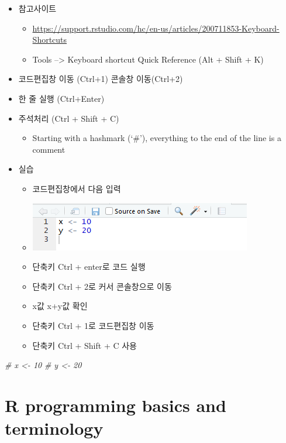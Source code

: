 \documentclass[]{book}
\newenvironment{Shaded}{\begin{snugshade}}{\end{snugshade}}
\newcommand{\CommentTok}[1]{\textcolor[rgb]{0.56,0.35,0.01}{\textit{#1}}}
\providecommand{\tightlist}{%
  \setlength{\itemsep}{0pt}\setlength{\parskip}{0pt}}
\begin{document}
\begin{itemize}
\item
  참고사이트

  \begin{itemize}
  \tightlist
  \item
    \url{https://support.rstudio.com/hc/en-us/articles/200711853-Keyboard-Shortcuts}
  \item
    Tools --\textgreater{} Keyboard shortcut Quick Reference (Alt + Shift + K)
  \end{itemize}
\item
  코드편집창 이동 (Ctrl+1) 콘솔창 이동(Ctrl+2)
\item
  한 줄 실행 (Ctrl+Enter)
\item
  주석처리 (Ctrl + Shift + C)

  \begin{itemize}
  \tightlist
  \item
    Starting with a hashmark (`\#'), everything to the end of the line is a comment
  \end{itemize}
\item
  실습

  \begin{itemize}
  \tightlist
  \item
    코드편집창에서 다음 입력
  \item
    \includegraphics{images/01-14.PNG}\\
  \item
    단축키 Ctrl + enter로 코드 실행
  \item
    단축키 Ctrl + 2로 커서 콘솔창으로 이동
  \item
    x값 x+y값 확인
  \item
    단축키 Ctrl + 1로 코드편집창 이동
  \item
    단축키 Ctrl + Shift + C 사용
  \end{itemize}
\end{itemize}

\begin{Shaded}
\begin{Highlighting}[]
\CommentTok{# x <- 10}
\CommentTok{# y <- 20}
\end{Highlighting}
\end{Shaded}

\hypertarget{r-programming-basics-and-terminology}{%
\section{R programming basics and terminology}\label{r-programming-basics-and-terminology}}
\end{document}

